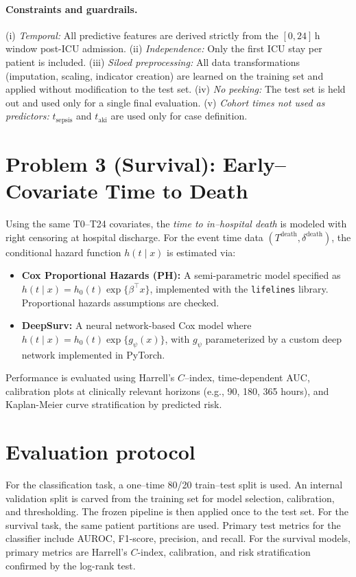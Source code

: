 \paragraph{Constraints and guardrails.}
(i) \emph{Temporal:} All predictive features are derived strictly from the $[0,24]$\,h window post-ICU admission. (ii) \emph{Independence:} Only the first ICU stay per patient is included. (iii) \emph{Siloed preprocessing:} All data transformations (imputation, scaling, indicator creation) are learned on the training set and applied without modification to the test set. (iv) \emph{No peeking:} The test set is held out and used only for a single final evaluation. (v) \emph{Cohort times not used as predictors:} $t_{\text{sepsis}}$ and $t_{\text{aki}}$ are used only for case definition.

\section{Problem 3 (Survival): Early–Covariate Time to Death}
Using the same T0--T24 covariates, the \emph{time to in–hospital death} is modeled with right censoring at hospital discharge. For the event time data $(T^{\mathrm{death}},\delta^{\mathrm{death}})$, the conditional hazard function $h(t\mid x)$ is estimated via:
\begin{itemize}
  \item \textbf{Cox Proportional Hazards (PH):} A semi-parametric model specified as $h(t\mid x)=h_0(t)\exp\{\beta^\top x\}$, implemented with the \texttt{lifelines} library. Proportional hazards assumptions are checked.
  \item \textbf{DeepSurv:} A neural network-based Cox model where $h(t\mid x)=h_0(t)\exp\{g_{\psi}(x)\}$, with $g_\psi$ parameterized by a custom deep network implemented in PyTorch.
\end{itemize}
Performance is evaluated using Harrell’s $C$–index, time-dependent AUC, calibration plots at clinically relevant horizons (e.g., 90, 180, 365 hours), and Kaplan-Meier curve stratification by predicted risk.

\section{Evaluation protocol}
For the classification task, a one–time 80/20 train–test split is used. An internal validation split is carved from the training set for model selection, calibration, and thresholding. The frozen pipeline is then applied once to the test set. For the survival task, the same patient partitions are used. Primary test metrics for the classifier include AUROC, F1-score, precision, and recall. For the survival models, primary metrics are Harrell’s $C$-index, calibration, and risk stratification confirmed by the log-rank test.

